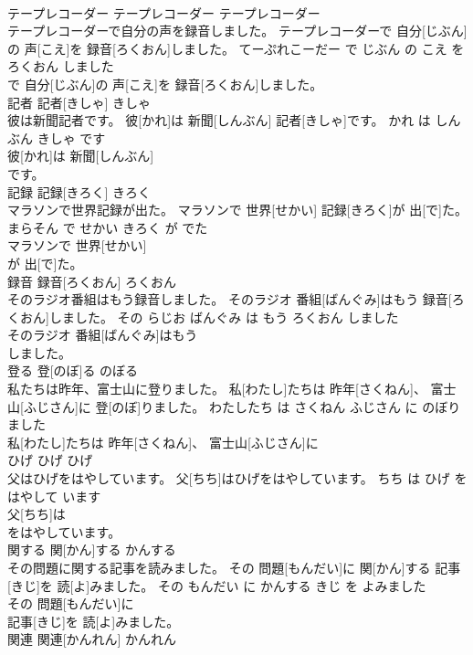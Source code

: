 \documentclass[8pt]{extreport}
\begin{document}
\begin{CJK}{UTF8}{min}
\\	テープレコーダー	テープレコーダー	テープレコーダー	
\\	テープレコーダーで自分の声を録音しました。	テープレコーダーで 自分[じぶん]の 声[こえ]を 録音[ろくおん]しました。	てーぷれこーだー で じぶん の こえ を ろくおん しました	
\\	で 自分[じぶん]の 声[こえ]を 録音[ろくおん]しました。			
\\	記者	記者[きしゃ]	きしゃ	
\\	彼は新聞記者です。	彼[かれ]は 新聞[しんぶん] 記者[きしゃ]です。	かれ は しんぶん きしゃ です	
\\	彼[かれ]は 新聞[しんぶん]
\\	です。			
\\	記録	記録[きろく]	きろく	
\\	マラソンで世界記録が出た。	マラソンで 世界[せかい] 記録[きろく]が 出[で]た。	まらそん で せかい きろく が でた	
\\	マラソンで 世界[せかい]
\\	が 出[で]た。			
\\	録音	録音[ろくおん]	ろくおん	
\\	そのラジオ番組はもう録音しました。	そのラジオ 番組[ばんぐみ]はもう 録音[ろくおん]しました。	その らじお ばんぐみ は もう ろくおん しました	
\\	そのラジオ 番組[ばんぐみ]はもう
\\	しました。			
\\	登る	登[のぼ]る	のぼる	
\\	私たちは昨年、富士山に登りました。	私[わたし]たちは 昨年[さくねん]、 富士山[ふじさん]に 登[のぼ]りました。	わたしたち は さくねん ふじさん に のぼりました	
\\	私[わたし]たちは 昨年[さくねん]、 富士山[ふじさん]に
\\	ひげ	ひげ	ひげ	
\\	父はひげをはやしています。	父[ちち]はひげをはやしています。	ちち は ひげ を はやして います	
\\	父[ちち]は
\\	をはやしています。			
\\	関する	関[かん]する	かんする	
\\	その問題に関する記事を読みました。	その 問題[もんだい]に 関[かん]する 記事[きじ]を 読[よ]みました。	その もんだい に かんする きじ を よみました	
\\	その 問題[もんだい]に
\\	記事[きじ]を 読[よ]みました。			
\\	関連	関連[かんれん]	かんれん	

\end{CJK}
\end{document}
